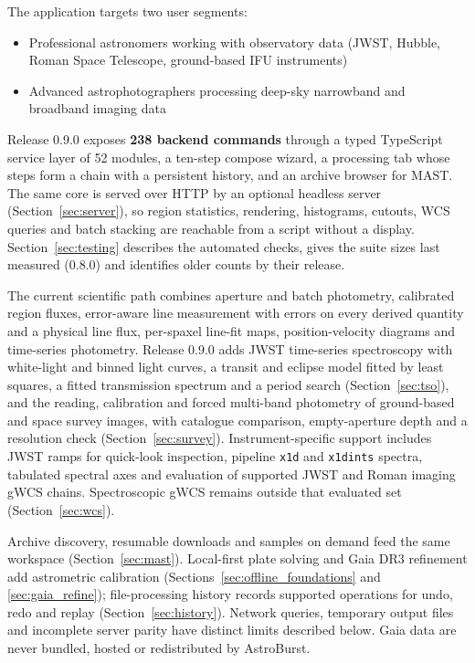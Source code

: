 \documentclass[11pt,a4paper]{article}
\newcommand{\code}[1]{\texttt{\small #1}}
\newcommand{\nCommands}{238}
\newcommand{\nServices}{52}
\begin{document}
    The application targets two user segments:
    \begin{itemize}[nosep]
    \item Professional astronomers working with observatory data (JWST, Hubble, Roman Space Telescope, ground-based IFU instruments)
    \item Advanced astrophotographers processing deep-sky narrowband and broadband imaging data
    \end{itemize}

    Release 0.9.0 exposes \textbf{\nCommands{} backend commands} through a typed TypeScript service layer of \nServices{} modules, a ten-step compose wizard, a processing tab whose steps form a chain with a persistent history, and an archive browser for MAST. The same core is served over HTTP by an optional headless server (Section~\ref{sec:server}), so region statistics, rendering, histograms, cutouts, WCS queries and batch stacking are reachable from a script without a display. Section~\ref{sec:testing} describes the automated checks, gives the suite sizes last measured (0.8.0) and identifies older counts by their release.

    The current scientific path combines aperture and batch photometry, calibrated region fluxes, error-aware line measurement with errors on every derived quantity and a physical line flux, per-spaxel line-fit maps, position-velocity diagrams and time-series photometry. Release 0.9.0 adds JWST time-series spectroscopy with white-light and binned light curves, a transit and eclipse model fitted by least squares, a fitted transmission spectrum and a period search (Section~\ref{sec:tso}), and the reading, calibration and forced multi-band photometry of ground-based and space survey images, with catalogue comparison, empty-aperture depth and a resolution check (Section~\ref{sec:survey}). Instrument-specific support includes JWST ramps for quick-look inspection, pipeline \code{x1d} and \code{x1dints} spectra, tabulated spectral axes and evaluation of supported JWST and Roman imaging gWCS chains. Spectroscopic gWCS remains outside that evaluated set (Section~\ref{sec:wcs}).

    Archive discovery, resumable downloads and samples on demand feed the same workspace (Section~\ref{sec:mast}). Local-first plate solving and Gaia DR3 refinement add astrometric calibration (Sections~\ref{sec:offline_foundations} and \ref{sec:gaia_refine}); file-processing history records supported operations for undo, redo and replay (Section~\ref{sec:history}). Network queries, temporary output files and incomplete server parity have distinct limits described below. Gaia data are never bundled, hosted or redistributed by AstroBurst.
\end{document}
